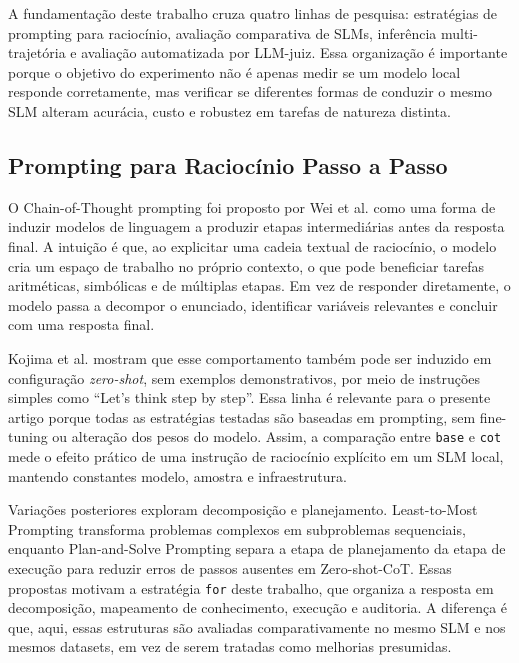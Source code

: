 \documentclass[12pt]{article}
\begin{document}
A fundamentação deste trabalho cruza quatro linhas de pesquisa: estratégias de prompting para raciocínio, avaliação comparativa de SLMs, inferência multi-trajetória e avaliação automatizada por LLM-juiz. Essa organização é importante porque o objetivo do experimento não é apenas medir se um modelo local responde corretamente, mas verificar se diferentes formas de conduzir o mesmo SLM alteram acurácia, custo e robustez em tarefas de natureza distinta.

\subsection{Prompting para Raciocínio Passo a Passo}

O Chain-of-Thought prompting foi proposto por Wei et al. \cite{wei2022} como uma forma de induzir modelos de linguagem a produzir etapas intermediárias antes da resposta final. A intuição é que, ao explicitar uma cadeia textual de raciocínio, o modelo cria um espaço de trabalho no próprio contexto, o que pode beneficiar tarefas aritméticas, simbólicas e de múltiplas etapas. Em vez de responder diretamente, o modelo passa a decompor o enunciado, identificar variáveis relevantes e concluir com uma resposta final.

Kojima et al. \cite{kojima2022} mostram que esse comportamento também pode ser induzido em configuração \textit{zero-shot}, sem exemplos demonstrativos, por meio de instruções simples como ``Let's think step by step''. Essa linha é relevante para o presente artigo porque todas as estratégias testadas são baseadas em prompting, sem fine-tuning ou alteração dos pesos do modelo. Assim, a comparação entre \texttt{base} e \texttt{cot} mede o efeito prático de uma instrução de raciocínio explícito em um SLM local, mantendo constantes modelo, amostra e infraestrutura.

Variações posteriores exploram decomposição e planejamento. Least-to-Most Prompting \cite{zhou2023} transforma problemas complexos em subproblemas sequenciais, enquanto Plan-and-Solve Prompting \cite{wang2023plansolve} separa a etapa de planejamento da etapa de execução para reduzir erros de passos ausentes em Zero-shot-CoT. Essas propostas motivam a estratégia \texttt{for} deste trabalho, que organiza a resposta em decomposição, mapeamento de conhecimento, execução e auditoria. A diferença é que, aqui, essas estruturas são avaliadas comparativamente no mesmo SLM e nos mesmos datasets, em vez de serem tratadas como melhorias presumidas.
\end{document}
